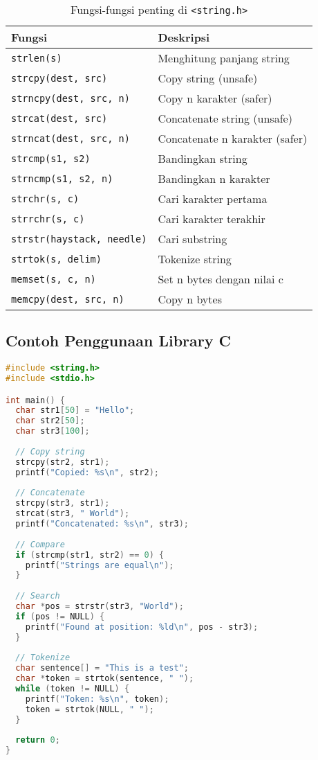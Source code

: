 \documentclass[../main.tex]{subfiles}
\begin{document}
\begin{table}[H]
  \centering
  \caption{Fungsi-fungsi penting di \texttt{<string.h>}}
  \begin{tabular}{@{}lp{8cm}@{}}
    \toprule
    Fungsi & Deskripsi \\
    \midrule
    \texttt{strlen(s)} & Menghitung panjang string \\
    \texttt{strcpy(dest, src)} & Copy string (unsafe) \\
    \texttt{strncpy(dest, src, n)} & Copy n karakter (safer) \\
    \texttt{strcat(dest, src)} & Concatenate string (unsafe) \\
    \texttt{strncat(dest, src, n)} & Concatenate n karakter (safer) \\
    \texttt{strcmp(s1, s2)} & Bandingkan string \\
    \texttt{strncmp(s1, s2, n)} & Bandingkan n karakter \\
    \texttt{strchr(s, c)} & Cari karakter pertama \\
    \texttt{strrchr(s, c)} & Cari karakter terakhir \\
    \texttt{strstr(haystack, needle)} & Cari substring \\
    \texttt{strtok(s, delim)} & Tokenize string \\
    \texttt{memset(s, c, n)} & Set n bytes dengan nilai c \\
    \texttt{memcpy(dest, src, n)} & Copy n bytes \\
    \bottomrule
  \end{tabular}
\end{table}

\subsection{Contoh Penggunaan Library C}

\begin{lstlisting}[language=C, caption={Contoh fungsi string C}]
#include <string.h>
#include <stdio.h>

int main() {
  char str1[50] = "Hello";
  char str2[50];
  char str3[100];
  
  // Copy string
  strcpy(str2, str1);
  printf("Copied: %s\n", str2);
  
  // Concatenate
  strcpy(str3, str1);
  strcat(str3, " World");
  printf("Concatenated: %s\n", str3);
  
  // Compare
  if (strcmp(str1, str2) == 0) {
    printf("Strings are equal\n");
  }
  
  // Search
  char *pos = strstr(str3, "World");
  if (pos != NULL) {
    printf("Found at position: %ld\n", pos - str3);
  }
  
  // Tokenize
  char sentence[] = "This is a test";
  char *token = strtok(sentence, " ");
  while (token != NULL) {
    printf("Token: %s\n", token);
    token = strtok(NULL, " ");
  }
  
  return 0;
}
\end{lstlisting}
\end{document}
